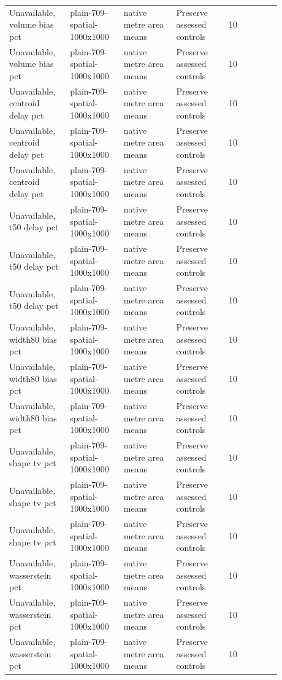 \begin{longtable}{p{0.1760\linewidth}p{0.1760\linewidth}p{0.1760\linewidth}p{0.1760\linewidth}p{0.1760\linewidth}}
Unavailable, volume bias pct & plain-709-spatial-1000x1000 & native metre area means & Preserve assessed controls & 10 \\
Unavailable, volume bias pct & plain-709-spatial-1000x1000 & native metre area means & Preserve assessed controls & 10 \\
Unavailable, centroid delay pct & plain-709-spatial-1000x1000 & native metre area means & Preserve assessed controls & 10 \\
Unavailable, centroid delay pct & plain-709-spatial-1000x1000 & native metre area means & Preserve assessed controls & 10 \\
Unavailable, centroid delay pct & plain-709-spatial-1000x1000 & native metre area means & Preserve assessed controls & 10 \\
Unavailable, t50 delay pct & plain-709-spatial-1000x1000 & native metre area means & Preserve assessed controls & 10 \\
Unavailable, t50 delay pct & plain-709-spatial-1000x1000 & native metre area means & Preserve assessed controls & 10 \\
Unavailable, t50 delay pct & plain-709-spatial-1000x1000 & native metre area means & Preserve assessed controls & 10 \\
Unavailable, width80 bias pct & plain-709-spatial-1000x1000 & native metre area means & Preserve assessed controls & 10 \\
Unavailable, width80 bias pct & plain-709-spatial-1000x1000 & native metre area means & Preserve assessed controls & 10 \\
Unavailable, width80 bias pct & plain-709-spatial-1000x1000 & native metre area means & Preserve assessed controls & 10 \\
Unavailable, shape tv pct & plain-709-spatial-1000x1000 & native metre area means & Preserve assessed controls & 10 \\
Unavailable, shape tv pct & plain-709-spatial-1000x1000 & native metre area means & Preserve assessed controls & 10 \\
Unavailable, shape tv pct & plain-709-spatial-1000x1000 & native metre area means & Preserve assessed controls & 10 \\
Unavailable, wasserstein pct & plain-709-spatial-1000x1000 & native metre area means & Preserve assessed controls & 10 \\
Unavailable, wasserstein pct & plain-709-spatial-1000x1000 & native metre area means & Preserve assessed controls & 10 \\
Unavailable, wasserstein pct & plain-709-spatial-1000x1000 & native metre area means & Preserve assessed controls & 10 \\

\end{longtable}
